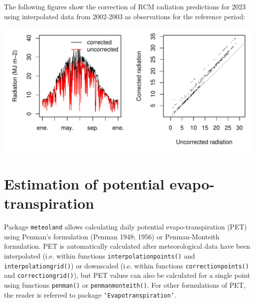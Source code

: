 \documentclass[11pt,a4paper]{article}
\begin{document}
The following figures show the correction of RCM radiation predictions for 2023 using interpolated data from 2002-2003 as observations for the reference period:
\begin{center}
\includegraphics{Meteorology-021}
\end{center}



\section{Estimation of potential evapo-transpiration}
Package \texttt{meteoland} allows calculating daily potential evapo-transpiration (PET) using Penman's formulation (Penman 1948; 1956) or Penman-Monteith formulation. PET is automatically calculated after meteorological data have been interpolated (i.e. within functions \texttt{interpolationpoints()} and \texttt{interpolationgrid()}) or downscaled (i.e. within functions \texttt{correctionpoints()} and \texttt{correctiongrid()}), but PET values can also be calculated for a single point using functions \texttt{penman()} or \texttt{penmanmonteith()}. For other formulations of PET, the reader is referred to package \texttt{`Evapotranspiration'}.
\end{document}
